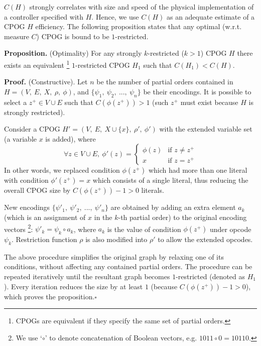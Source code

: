 $C(H)$ strongly correlates with size and speed of the physical implementation
of a controller specified with $H$. Hence, we use $C(H)$ as an adequate
estimate of a CPOG $H$ efficiency. The following proposition states
that any optimal (w.r.t. measure $C$) CPOG is bound to be $1$-restricted.

\textbf{Proposition.} (Optimality) For any strongly $k$-restricted
($k>1$) CPOG $H$ there exists an equivalent%
\footnote{CPOGs are equivalent if they specify the same set of partial orders.%
} $1$-restricted CPOG $H_{1}$ such that $C(H_{1})<C(H)$.

\textbf{Proof}\textbf{\emph{.}} (Constructive). Let $n$ be the number
of partial orders contained in $H=(V,\ E,\ X,\ \rho,\ \phi)$, and
$\{\psi_{1},\ \psi_{2},\ ...,\ \psi_{n}\}$ be their encodings. It
is possible to select a $z^{+}\in V\cup E$ such that $C(\phi(z^{+}))>1$
(such $z^{+}$ must exist because $H$ is strongly restricted). 

Consider a CPOG $H'=(V,\ E,\ X\cup\{x\},\ \rho',\ \phi')$ with the
extended variable set (a variable $x$ is added), where
\[
\forall z\in V\cup E,\ \phi'(z)=\begin{cases}
\phi(z) & \text{if }z\neq z^{+}\\
x & \text{if }z=z^{+}
\end{cases}
\]
In other words, we replaced condition $\phi(z^{+})$ which had more
than one literal with condition $\phi'(z^{+})=x$ which consists of
a single literal, thus reducing the overall CPOG size by $C(\phi(z^{+}))-1>0$
literals.

New encodings $\{\psi'_{1},\ \psi'_{2},\ ...,\ \psi'_{n}\}$ are obtained
by adding an extra element $a_{k}$ (which is an assignment of $x$
in the $k$-th partial order) to the original encoding vectors%
\footnote{We use `$\circ$' to denote concatenation of Boolean vectors, e.g.
$1011\circ0=10110$.%
}: $\psi'_{k}=\psi_{k}\circ a_{k}$, where $a_{k}$ is the value of
condition $\phi(z^{+})$ under opcode $\psi_{k}$. Restriction function
$\rho$ is also modified into $\rho'$ to allow the extended opcodes.

The above procedure simplifies the original graph by relaxing one
of its conditions, without affecting any contained partial orders.
The procedure can be repeated iteratively until the resultant graph
becomes $1$-restricted (denoted as $H_{1}$). Every iteration reduces
the size by at least $1$ (because $C(\phi(z^{+}))-1>0$), which proves
the proposition.\hspace*{\fill}$\square$

